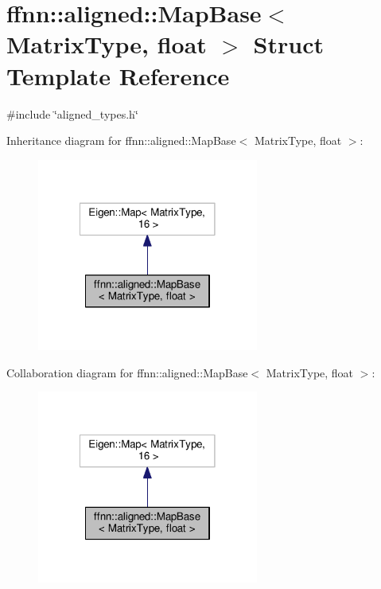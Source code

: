 \hypertarget{structffnn_1_1aligned_1_1_map_base_3_01_matrix_type_00_01float_01_4}{\section{ffnn\-:\-:aligned\-:\-:Map\-Base$<$ Matrix\-Type, float $>$ Struct Template Reference}
\label{structffnn_1_1aligned_1_1_map_base_3_01_matrix_type_00_01float_01_4}
}


{\ttfamily \#include \char`\"{}aligned\-\_\-types.\-h\char`\"{}}



Inheritance diagram for ffnn\-:\-:aligned\-:\-:Map\-Base$<$ Matrix\-Type, float $>$\-:\nopagebreak
\begin{figure}[H]
\begin{center}
\leavevmode
\includegraphics[width=206pt]{structffnn_1_1aligned_1_1_map_base_3_01_matrix_type_00_01float_01_4__inherit__graph}
\end{center}
\end{figure}


Collaboration diagram for ffnn\-:\-:aligned\-:\-:Map\-Base$<$ Matrix\-Type, float $>$\-:\nopagebreak
\begin{figure}[H]
\begin{center}
\leavevmode
\includegraphics[width=206pt]{structffnn_1_1aligned_1_1_map_base_3_01_matrix_type_00_01float_01_4__coll__graph}
\end{center}
\end{figure}
